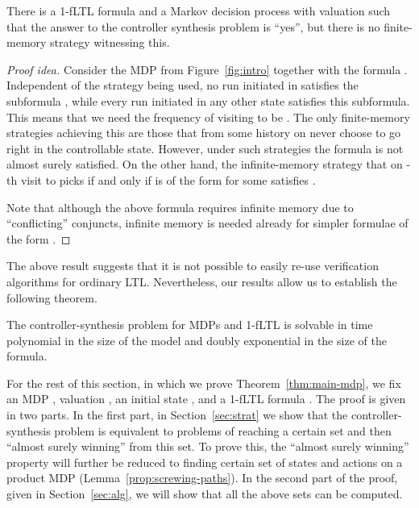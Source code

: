 \documentclass[a4paper,UKenglish]{lipics}
\begin{document}
\begin{theorem}\label{thm:inf}
	There is a 1-fLTL formula  and a Markov decision process  with valuation  such that the answer to the controller synthesis problem is ``yes'', but there is no finite-memory strategy witnessing this.
\end{theorem}
\begin{proof}[Proof idea]
	Consider the MDP from Figure~\ref{fig:intro} together with the formula
	.
	Independent of the strategy being used, no run initiated in  satisfies
	the subformula , while every run initiated in any other state satisfies
	this subformula. This means that we need the frequency of visiting  to be .
	The only finite-memory strategies achieving this are those that from some history
	on never choose to go right in the controllable state. However, under such strategies the formula  
	 is not almost surely satisfied.
On the other hand, the infinite-memory strategy that on -th visit to  picks  if and only if  is of the form  for some  satisfies .
	
	Note that although the above formula requires infinite memory due to ``conflicting'' conjuncts, infinite memory is needed already for simpler
	formulae of the form .
\end{proof}

The above result suggests that it is not possible to easily re-use verification algorithms for
ordinary LTL. Nevertheless, our results allow us to establish the following theorem.

\begin{theorem}\label{thm:main-mdp}
	The controller-synthesis problem for MDPs and 1-fLTL is solvable in time polynomial
	in the size of the model and doubly exponential in the size of the formula.
\end{theorem}

For the rest of this section, in which we prove Theorem~\ref{thm:main-mdp}, we fix an MDP , valuation , an initial state ,
and a 1-fLTL formula . The proof is given in two parts. In the first part, in Section~\ref{sec:strat} we show that the controller-synthesis problem is equivalent to problems of reaching a certain set  and then ``almost surely winning'' from this set. To prove this, the ``almost surely winning'' property will further be reduced to finding certain set of states and actions on a product MDP (Lemma~\ref{prop:screwing-paths}). In the second part of the proof, given in Section~\ref{sec:alg}, we will show that all the above sets can be computed.
\end{document}
